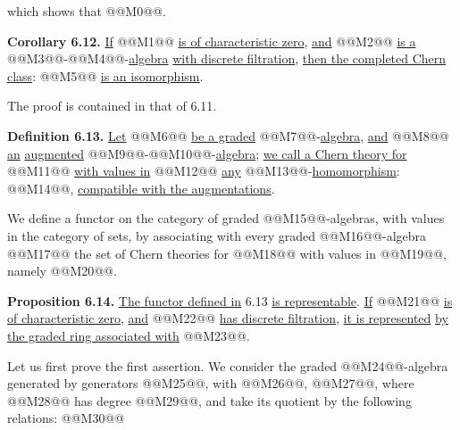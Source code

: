 which shows that @@M0@@.

\textbf{Corollary 6.12.} \uline{If} @@M1@@ \uline{is of characteristic zero}, \uline{and} @@M2@@ \uline{is a} @@M3@@-@@M4@@-\uline{algebra} \uline{with discrete filtration}, \uline{then the completed Chern class}:
@@M5@@
\uline{is an isomorphism}.

The proof is contained in that of 6.11.

\textbf{Definition 6.13.} \uline{Let} @@M6@@ \uline{be a graded} @@M7@@-\uline{algebra}, \uline{and} @@M8@@ \uline{an} \uline{augmented} @@M9@@-@@M10@@-\uline{algebra}; \uline{we call a Chern theory for} @@M11@@ \uline{with values in} @@M12@@ \uline{any} @@M13@@-\uline{homomorphism}: @@M14@@, \uline{compatible with the augmentations}.

We define a functor on the category of graded @@M15@@-algebras, with values in the category of sets, by associating with every graded @@M16@@-algebra @@M17@@ the set of Chern theories for @@M18@@ with values in @@M19@@, namely @@M20@@.

\textbf{Proposition 6.14.} \uline{The functor defined in} 6.13 \uline{is representable}. \uline{If} @@M21@@ \uline{is} \uline{of characteristic zero}, \uline{and} @@M22@@ \uline{has discrete filtration}, \uline{it is represented} \uline{by the graded ring associated with} @@M23@@.

Let us first prove the first assertion. We consider the graded @@M24@@-algebra generated by generators @@M25@@, with @@M26@@, @@M27@@, where @@M28@@ has degree @@M29@@, and take its quotient by the following relations:
@@M30@@

